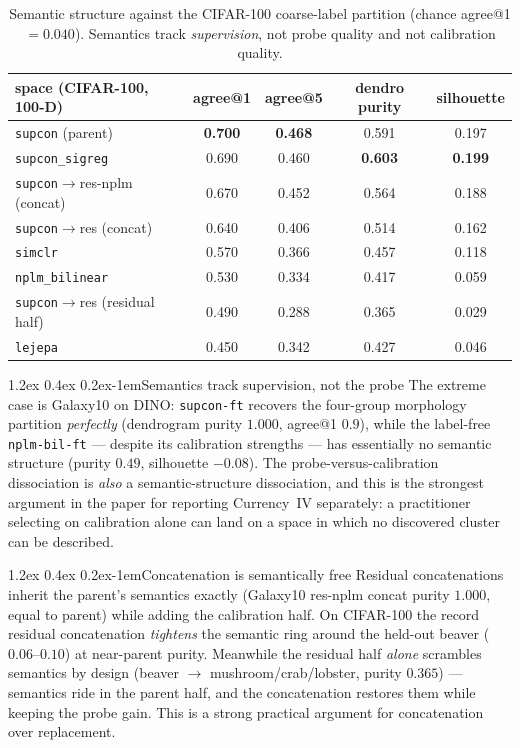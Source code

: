 \documentclass{article}
\makeatletter
\renewcommand\paragraph{\@startsection{paragraph}{4}{\z@}%
  {1.2ex \@plus 0.4ex \@minus 0.2ex}{-1em}{\normalsize\bf}}
\newcommand{\best}[1]{\textbf{#1}}
\makeatother
\begin{document}
\begin{table}[t]\centering\small
\begin{tabular}{lcccc}
\toprule
space (CIFAR-100, 100-D) & agree@1 & agree@5 & dendro purity & silhouette \\
\midrule
\texttt{supcon} (parent)              & \best{0.700} & \best{0.468} & 0.591 & 0.197 \\
\texttt{supcon\_sigreg}               & 0.690 & 0.460 & \best{0.603} & \best{0.199} \\
\texttt{supcon}$\to$res-nplm (concat) & 0.670 & 0.452 & 0.564 & 0.188 \\
\texttt{supcon}$\to$res (concat)      & 0.640 & 0.406 & 0.514 & 0.162 \\
\texttt{simclr}                       & 0.570 & 0.366 & 0.457 & 0.118 \\
\texttt{nplm\_bilinear}               & 0.530 & 0.334 & 0.417 & 0.059 \\
\texttt{supcon}$\to$res (residual half) & 0.490 & 0.288 & 0.365 & 0.029 \\
\texttt{lejepa}                       & 0.450 & 0.342 & 0.427 & 0.046 \\
\bottomrule
\end{tabular}
\caption{Semantic structure against the CIFAR-100 coarse-label partition
(chance agree@1 $=0.040$). Semantics track \emph{supervision}, not probe
quality and not calibration quality.}
\label{tab:interp}
\end{table}

\paragraph{Semantics track supervision, not the probe}
The extreme case is Galaxy10 on DINO: \texttt{supcon-ft} recovers the
four-group morphology partition \emph{perfectly} (dendrogram purity $1.000$,
agree@1 $0.9$), while the label-free \texttt{nplm-bil-ft} --- despite its
calibration strengths --- has essentially no semantic structure (purity $0.49$,
silhouette $-0.08$). The probe-versus-calibration dissociation is
\emph{also} a semantic-structure dissociation, and this is the strongest
argument in the paper for reporting Currency~IV separately: a practitioner
selecting on calibration alone can land on a space in which no discovered
cluster can be described.

\paragraph{Concatenation is semantically free}
Residual concatenations inherit the parent's semantics exactly (Galaxy10
res-nplm concat purity $1.000$, equal to parent) while adding the calibration
half. On CIFAR-100 the record residual concatenation \emph{tightens} the
semantic ring around the held-out beaver ($0.06$--$0.10$) at near-parent
purity. Meanwhile the residual half \emph{alone} scrambles semantics by design
(beaver $\to$ mushroom/crab/lobster, purity $0.365$) --- semantics ride in the
parent half, and the concatenation restores them while keeping the probe gain.
This is a strong practical argument for concatenation over replacement.
\end{document}
